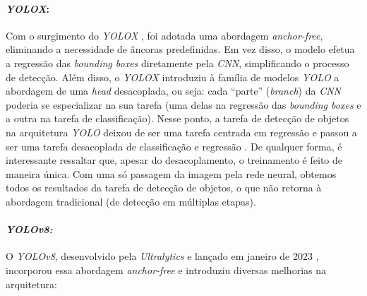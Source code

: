 \paragraph{\emph{YOLOX}:}
Com o surgimento do \emph{YOLOX} \cite{yolox2021}, foi adotada uma abordagem \emph{anchor-free}, eliminando a necessidade de âncoras predefinidas. Em vez disso, o modelo efetua a regressão das \emph{bounding boxes} diretamente pela \emph{CNN}, simplificando o processo de detecção. Além disso, o \emph{YOLOX} introduziu à família de modelos \emph{YOLO} a abordagem de uma \emph{head} desacoplada, ou seja: cada ``parte'' (\emph{branch}) da \emph{CNN} poderia se especializar na sua tarefa (uma delas na regressão das \emph{bounding boxes} e a outra na tarefa de classificação). Nesse ponto, a tarefa de detecção de objetos na arquitetura \emph{YOLO} deixou de ser uma tarefa centrada em regressão e passou a ser uma tarefa desacoplada de classificação e regressão \citep{yolox2021}. De qualquer forma, é interessante ressaltar que, apesar do desacoplamento, o treinamento é feito de maneira única. Com uma só passagem da imagem pela rede neural, obtemos todos os resultados da tarefa de detecção de objetos, o que não retorna à abordagem tradicional (de detecção em múltiplas etapas).

\paragraph{\emph{YOLOv8:}}
O \emph{YOLOv8}, desenvolvido pela \emph{Ultralytics} e lançado em janeiro de 2023 \citep{yolov8_2023}, incorporou essa abordagem \emph{anchor-free} e introduziu diversas melhorias na arquitetura:

